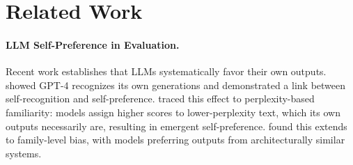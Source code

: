 














\section{Related Work}

\paragraph{LLM Self-Preference in Evaluation.}
Recent work establishes that LLMs systematically favor their own outputs. \citet{panickssery2024llmevaluatorsrecognizefavor} showed GPT-4 recognizes its own generations and demonstrated a link between self-recognition and self-preference. \citet{wataoka2024selfpreferencebias} traced this effect to perplexity-based familiarity: models assign higher scores to lower-perplexity text, which its own outputs necessarily are, resulting in emergent self-preference. \citet{spiliopoulou2025playfavoritesstatisticalmethod} found this extends to family-level bias, with models preferring outputs from architecturally similar systems.  



